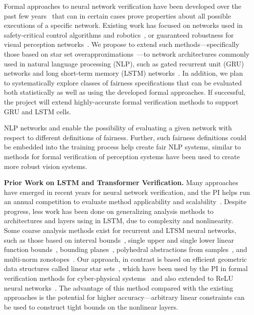 \documentclass[11pt]{article}
\begin{document}
\noindent
Formal approaches to neural network verification have been developed over the past few years~\cite{liu2019algorithms,tran2020verification,katz2017reluplex,gehr2018ai2} that can in certain cases prove properties about all possible executions of a specific network.
%
Existing work has focused on networks used in safety-critical control algorithms and robotics~\cite{ivanov2019verisig,xiang2020reachable}, or guaranteed robustness for visual perception networks~\cite{tran2019safety}.
%
We propose to extend such methods---specifically those based on star set overapproximations~\cite{tran2020verification}---to network architectures commonly used in natural language processing (NLP), such as gated recurrent unit (GRU) networks and long short-term memory (LSTM) networks~\cite{xingjian2015convolutional}.
%
In addition, we plan to systematically explore classes of fairness specifications that can be evaluated both statistically as well as using the developed formal approaches.
%
If successful, the project will extend highly-accurate formal verification methods to support GRU and LSTM cells.

NLP networks and enable the possibility of evaluating a given network with respect to different definitions of fairness.
%
Further, such fairness definitions could be embedded into the training process help create fair NLP systems, similar to methods for formal verification of perception systems have been used to create more robust vision systems.

\vspace{1em}
\noindent
\textbf{Prior Work on LSTM and Transformer Verification. } Many approaches have emerged in recent years for neural network verification, and the PI helps run an annual competition to evaluate method applicability and scalability~\cite{vnncomp2021}.
%
Despite progress, less work has been done on generalizing analysis methods to architectures and layers using in LSTM, due to complexity and nonlinearity.
%
Some coarse analysis methods exist for recurrent and LTSM neural networks, such as those based on interval bounds~\cite{jia2019certified}, single upper and single lower linear function bounds~\cite{ko2019popqorn,shi2020robustness}, bounding planes~\cite{du2021cert}, polyhedral abstractions from samples~\cite{ryou2021scalable}, and multi-norm zonotopes~\cite{bonaert2021fast}.
%
Our approach, in contrast is based on efficient geometric data structures called linear star sets~\cite{duggirala2016parsimonious}, which have been used by the PI in formal verification methods for cyber-physical systems~\cite{bak2017hscc,bak2019hscc} and also extended to ReLU neural networks~\cite{tran2019star,bak2020cav,bak2021nnenum}.
%
The advantage of this method compared with the existing approaches is the potential for higher accuracy---arbitrary linear constraints can be used to construct tight bounds on the nonlinear layers.
\end{document}
